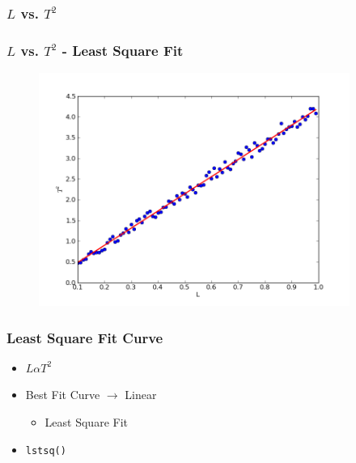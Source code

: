 \documentclass[14pt,compress]{beamer}
\newcommand{\typ}[1]{\lstinline{#1}}
\begin{document}
\begin{frame}[fragile]
  \frametitle{$L$ vs. $T^2$ }
  \frametitle{$L$ vs. $T^2$ - Least Square Fit}
  \vspace{-0.15in}
  \begin{figure}
    \includegraphics[width=4in]{data/least-sq-fit}
  \end{figure}
\end{frame}

\begin{frame}
  \frametitle{Least Square Fit Curve}
  \begin{center}
    \begin{itemize}
    \item $L \alpha T^2$
    \item Best Fit Curve $\rightarrow$ Linear
  \begin{itemize}
  \item Least Square Fit
  \end{itemize}
\item \typ{lstsq()} 
    \end{itemize}
  \end{center}
\end{frame}
\end{document}
